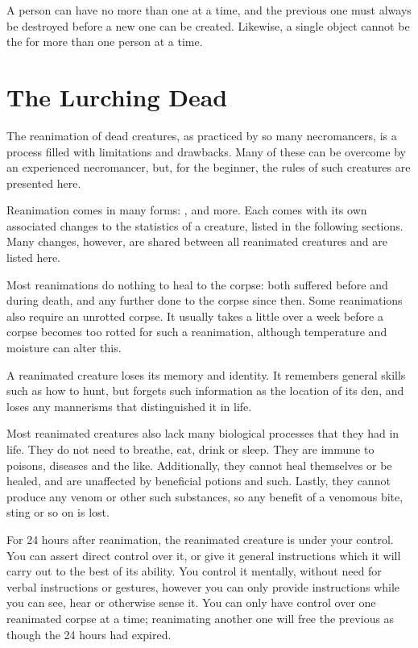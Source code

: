 A person can have no more than one {\phylactery} at a time, and the previous one must always be destroyed before a new one can be created.
Likewise, a single object cannot be the {\phylactery} for more than one person at a time.

\section{The Lurching Dead}

The reanimation of dead creatures, as practiced by so many necromancers, is a process filled with limitations and drawbacks.
Many of these can be overcome by an experienced necromancer, but, for the beginner, the rules of such creatures are presented here.

Reanimation comes in many forms: ,  and more.
Each comes with its own associated changes to the statistics of a creature, listed in the following sections.
Many changes, however, are shared between all reanimated creatures and are listed here.

Most reanimations do nothing to heal {\damage} to the corpse: both {\damage} suffered before and during death, and any further {\damage} done to the corpse since then.
Some reanimations also require an unrotted corpse.
It usually takes a little over a week before a corpse becomes too rotted for such a reanimation, although temperature and moisture can alter this.

A reanimated creature loses its memory and identity.
It remembers general skills such as how to hunt, but forgets such information as the location of its den, and loses any mannerisms that distinguished it in life.

Most reanimated creatures also lack many biological processes that they had in life.
They do not need to breathe, eat, drink or sleep.
They are immune to poisons, diseases and the like.
Additionally, they cannot heal themselves or be healed, and are unaffected by beneficial potions and such.
Lastly, they cannot produce any venom or other such substances, so any benefit of a venomous bite, sting or so on is lost.

For 24 hours after reanimation, the reanimated creature is under your control.
You can assert direct control over it, or give it general instructions which it will carry out to the best of its ability.
You control it mentally, without need for verbal instructions or gestures, however you can only provide instructions while you can see, hear or otherwise sense it.
You can only have control over one reanimated corpse at a time; reanimating another one will free the previous as though the 24 hours had expired.


